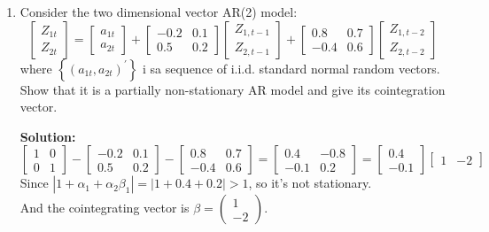 \documentclass{article}
\begin{document}
\begin{enumerate}
	\item Consider the two dimensional vector AR(2) model:
	\begin{equation*}
	\left[ \begin{array}{c}{Z_{1 t}} \\ {Z_{2 t}}\end{array}\right]=\left[ \begin{array}{c}{a_{1 t}} \\ {a_{2 t}}\end{array}\right]+\left[ \begin{array}{cc}{-0.2} & {0.1} \\ {0.5} & {0.2}\end{array}\right] \left[ \begin{array}{c}{Z_{1, t-1}} \\ {Z_{2, t-1}}\end{array}\right]+\left[ \begin{array}{cc}{0.8} & {0.7} \\ {-0.4} & {0.6}\end{array}\right] \left[ \begin{array}{c}{Z_{1, t-2}} \\ {Z_{2, t-2}}\end{array}\right]
	\end{equation*}
	where $\left\{\left(a_{1 t}, a_{2 t}\right)^{\prime}\right\}$ i sa sequence of i.i.d. standard normal random vectors.
	Show that it is a partially non-stationary AR model and give its cointegration vector.
	
	\textbf{Solution:}
	\begin{equation*}
	\left[ \begin{array}{ll}{1} & {0} \\ {0} & {1}\end{array}\right]-\left[ \begin{array}{cc}{-0.2} & {0.1} \\ {0.5} & {0.2}\end{array}\right]-\left[ \begin{array}{cc}{0.8} & {0.7} \\ {-0.4} & {0.6}\end{array}\right]=\left[ \begin{array}{cc}{0.4} & {-0.8} \\ {-0.1} & {0.2}\end{array}\right]=\left[ \begin{array}{c}{0.4} \\ {-0.1}\end{array}\right] \left[ \begin{array}{ll}{1} & {-2}\end{array}\right]
	\end{equation*}
	Since $|1+\alpha_1+\alpha_2\beta_1| = |1+0.4+0.2| > 1$, so it's not stationary.\\
	And the cointegrating vector is $\beta=\left( \begin{array}{c}{1} \\ {-2}\end{array}\right)$.
	

\end{enumerate}
\end{document}
